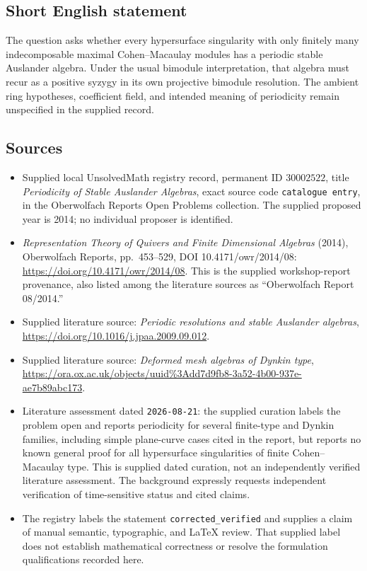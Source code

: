 \documentclass[11pt]{article}
\begin{document}
\subsection{Short English statement}
The question asks whether every hypersurface singularity with only finitely many indecomposable maximal Cohen--Macaulay modules has a periodic stable Auslander algebra. Under the usual bimodule interpretation, that algebra must recur as a positive syzygy in its own projective bimodule resolution. The ambient ring hypotheses, coefficient field, and intended meaning of periodicity remain unspecified in the supplied record.
\subsection{Sources}
\begin{itemize}
\item Supplied local UnsolvedMath registry record, permanent ID \(30002522\), title \emph{Periodicity of Stable Auslander Algebras}, exact source code \texttt{catalogue entry}, in the Oberwolfach Reports Open Problems collection. The supplied proposed year is 2014; no individual proposer is identified.
\item \emph{Representation Theory of Quivers and Finite Dimensional Algebras} (2014), Oberwolfach Reports, pp.~453--529, DOI 10.4171/owr/2014/08: \url{https://doi.org/10.4171/owr/2014/08}. This is the supplied workshop-report provenance, also listed among the literature sources as ``Oberwolfach Report 08/2014.''
\item Supplied literature source: \emph{Periodic resolutions and stable Auslander algebras}, \url{https://doi.org/10.1016/j.jpaa.2009.09.012}.
\item Supplied literature source: \emph{Deformed mesh algebras of Dynkin type}, \url{https://ora.ox.ac.uk/objects/uuid%3Add7d9fb8-3a52-4b00-937e-ae7b89abc173}.
\item Literature assessment dated \texttt{2026-08-21}: the supplied curation labels the problem open and reports periodicity for several finite-type and Dynkin families, including simple plane-curve cases cited in the report, but reports no known general proof for all hypersurface singularities of finite Cohen--Macaulay type. This is supplied dated curation, not an independently verified literature assessment. The background expressly requests independent verification of time-sensitive status and cited claims.
\item The registry labels the statement \texttt{corrected\_verified} and supplies a claim of manual semantic, typographic, and LaTeX review. That supplied label does not establish mathematical correctness or resolve the formulation qualifications recorded here.
\end{itemize}
\end{document}
